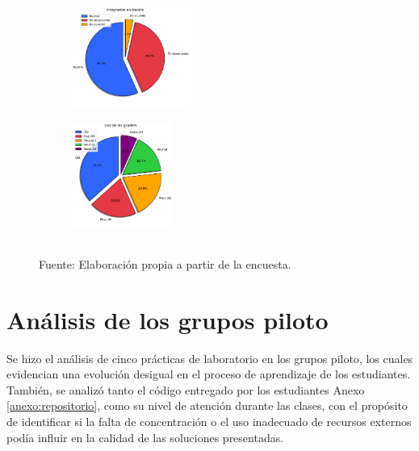 \documentclass[letter,oneside,12pt,spanish]{report}
\begin{document}
\begin{figure}[h]
	\centering
    \begin{subfigure}
        \centering
        \includegraphics[width=0.43\textwidth]{Figs/integracion_moodle.pdf}
    \end{subfigure}
	\hfill
    \begin{subfigure}
        \centering
        \includegraphics[width=0.37\textwidth]{Figs/uso_graders.pdf}
    \end{subfigure}
	\label{fig:MG}
	\\ Fuente: Elaboración propia a partir de la encuesta.
\end{figure}

\newpage

\section{Análisis de los grupos piloto}

Se hizo el análisis de cinco prácticas de laboratorio en los grupos piloto, los cuales evidencian una evolución desigual en el proceso de aprendizaje de los estudiantes. También, se analizó tanto el código entregado por los estudiantes Anexo \ref{anexo:repositorio}, como su nivel de atención durante las clases, con el propósito de identificar si la falta de concentración o el uso inadecuado de recursos externos podía influir en la calidad de las soluciones presentadas. 
\end{document}
